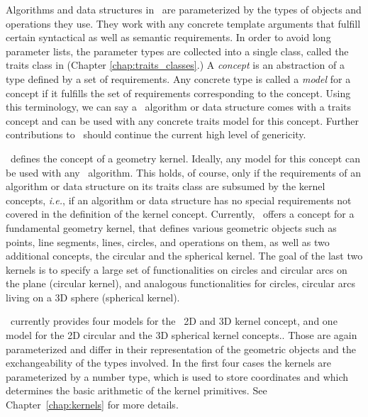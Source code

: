 Algorithms and data structures in \cgal\ are parameterized by the 
types of objects and operations they use. They work with any concrete 
template arguments that fulfill certain syntactical as well as semantic
requirements. In order to avoid long parameter lists,
the parameter types are collected into a single class, called the
traits class in \cgal{}
(Chapter \ref{chap:traits_classes}.)
A {\em concept} is an abstraction of a type 
defined by a set of requirements.
Any concrete type is called a {\em model} for a 
concept if it fulfills
the set of requirements corresponding to the concept. Using this terminology,
we can say a \cgal\ algorithm or data structure comes with a traits 
concept and can be used with any concrete traits model for this concept.
Further contributions to \cgal\ should continue the current high
level of genericity. 

\cgal\ defines the concept of a geometry kernel.%
Ideally, any
model for this concept can be used with any \cgal\ algorithm. This holds, 
of course, only if the requirements of an algorithm or data structure on its
traits class are subsumed by the kernel concepts, {\em i.e.}, if an
algorithm or data structure has no special requirements 
not covered in the definition of the kernel concept. Currently, \cgal\
offers a concept for a fundamental geometry kernel, that defines
various geometric objects such as points, line segments, lines,
circles, and operations on them, as well as two additional concepts,
the circular and the spherical kernel. The goal of the last two
kernels is to specify a large set of functionalities on circles and
circular arcs on the plane (circular kernel), and analogous
functionalities for circles, circular arcs living on a 3D sphere
(spherical kernel).

\cgal\ currently provides four models for the \cgal\ 2D and 3D kernel
concept, and one model for the 2D circular and the 3D spherical kernel
concepts.. Those are again parameterized and differ in their 
representation of the geometric objects and the exchangeability of
the types involved. 
In the first four cases the kernels are parameterized by a number type, which
is used to store coordinates and which determines the basic arithmetic
of the kernel primitives.  See Chapter~\ref{chap:kernels} for more
details.

